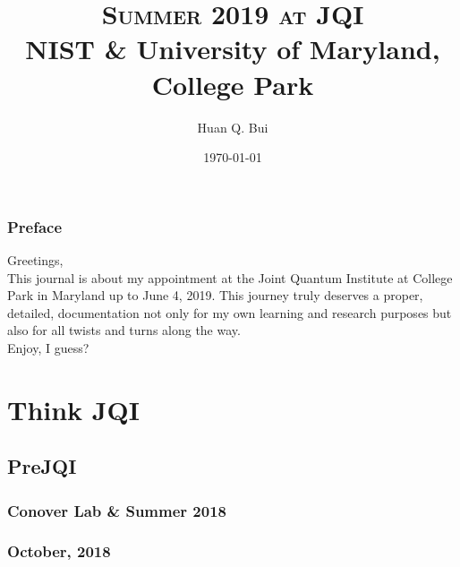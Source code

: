 \documentclass{report}
\theoremstyle{definition}
\begin{document}
	\begin{titlepage}\centering
		\clearpage
		\title{\textsc{\bf{Summer 2019 at JQI}}\\\smallskip NIST \& University of Maryland, College Park\\}
		\author{\bigskip Huan Q. Bui}
		\date{\today}
		\maketitle
		\thispagestyle{empty}
	\end{titlepage}

\newpage

\subsection*{Preface}

Greetings,\\

This journal is about my appointment at the Joint Quantum Institute at College Park in Maryland up to June 4, 2019. This journey truly deserves a proper, detailed, documentation not only for my own learning and research purposes but also for all twists and turns along the way.  \\

Enjoy, I guess?


\newpage
\tableofcontents
\newpage

\chapter{Think JQI}

\section{Pre\textendash JQI}

\subsection{Conover Lab \& Summer 2018}

\subsection{October, 2018}
\end{document}
